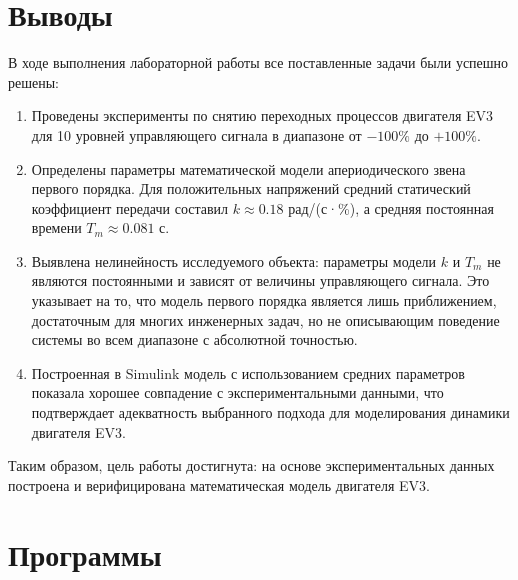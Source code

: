 \documentclass[a4paper, 12pt]{article}
\begin{document}
    \section{Выводы}
    В ходе выполнения лабораторной работы все поставленные задачи были успешно решены:
    \begin{enumerate}
        \item Проведены эксперименты по снятию переходных процессов двигателя EV3 для 10 уровней управляющего сигнала в диапазоне от \(-100\%\) до \(+100\%\).
        \item Определены параметры математической модели апериодического звена первого порядка. Для положительных напряжений средний статический коэффициент передачи составил \(k \approx 0.18\) рад/(с·\%), а средняя постоянная времени \(T_m \approx 0.081\) с.
        \item Выявлена нелинейность исследуемого объекта: параметры модели \(k\) и \(T_m\) не являются постоянными и зависят от величины управляющего сигнала. Это указывает на то, что модель первого порядка является лишь приближением, достаточным для многих инженерных задач, но не описывающим поведение системы во всем диапазоне с абсолютной точностью.
        \item Построенная в Simulink модель с использованием средних параметров показала хорошее совпадение с экспериментальными данными, что подтверждает адекватность выбранного подхода для моделирования динамики двигателя EV3.
    \end{enumerate}
    Таким образом, цель работы достигнута: на основе экспериментальных данных построена и верифицирована математическая модель двигателя EV3.

    \newpage


    \section{Программы}
\end{document}
